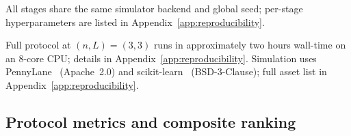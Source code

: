 \documentclass{article}
\begin{document}
\begin{table}[t]
  \caption{Methods included in the reference evaluation and the source of non-linearity each isolates. Dashes in the parameter column mark classical baselines whose widths are set by the hybrid and real-data stages and are not matched to the six quantum counts.}
  \label{tab:registry}
  \centering
  \small
\end{table}

All stages share the same simulator backend and global seed; per-stage hyperparameters are listed in Appendix~\ref{app:reproducibility}.

Full protocol at $(n,L)=(3,3)$ runs in approximately two hours wall-time on an 8-core CPU; details in Appendix~\ref{app:reproducibility}.
Simulation uses PennyLane~\citep{bergholm2018pennylane} (Apache~2.0) and scikit-learn~\citep{pedregosa2011scikitlearn} (BSD-3-Clause); full asset list in Appendix~\ref{app:reproducibility}.

\subsection{Protocol metrics and composite ranking}
\label{sec:protocol-results}
\end{document}
